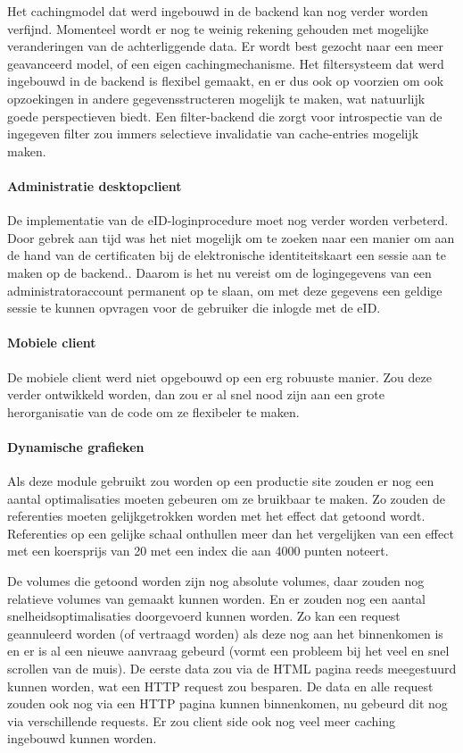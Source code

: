 Het cachingmodel dat werd ingebouwd in de backend kan nog verder worden verfijnd. Momenteel wordt er nog te weinig rekening gehouden met mogelijke veranderingen van de achterliggende data. Er wordt best gezocht naar een meer geavanceerd model, of een eigen cachingmechanisme. Het filtersysteem dat werd ingebouwd in de backend is flexibel gemaakt, en er dus ook op voorzien om ook opzoekingen in andere gegevensstructeren mogelijk te maken, wat natuurlijk goede perspectieven biedt. Een filter-backend die zorgt voor introspectie van de ingegeven filter zou immers selectieve invalidatie van cache-entries mogelijk maken.

\paragraph{Administratie desktopclient} De implementatie van de eID-loginprocedure moet nog verder worden verbeterd.  Door gebrek aan tijd was het niet mogelijk om te zoeken naar een manier om aan de hand van de certificaten bij de elektronische identiteitskaart een sessie aan te maken op de backend.. Daarom is het nu vereist om de logingegevens van een administratoraccount permanent op te slaan, om met deze gegevens een geldige sessie te kunnen opvragen voor de gebruiker die inlogde met de eID.

\paragraph{Mobiele client} De mobiele client werd niet opgebouwd op een erg robuuste manier. Zou deze verder ontwikkeld worden, dan zou er al snel nood zijn aan een grote herorganisatie van de code om ze flexibeler te maken.

\paragraph{Dynamische grafieken} Als deze module gebruikt zou worden op een productie site zouden er nog een aantal optimalisaties moeten gebeuren om ze bruikbaar te maken. Zo zouden de referenties moeten gelijkgetrokken worden met het effect dat getoond wordt. Referenties op een gelijke schaal onthullen meer dan het vergelijken van een effect met een koersprijs van 20 met een index die aan 4000 punten noteert.

De volumes die getoond worden zijn nog absolute volumes, daar zouden nog relatieve volumes van gemaakt kunnen worden. En er zouden nog een aantal snelheidsoptimalisaties doorgevoerd kunnen worden. Zo kan een request geannuleerd worden (of vertraagd worden) als deze nog aan het binnenkomen is en er is al een nieuwe aanvraag gebeurd (vormt een probleem bij het veel en snel scrollen van de muis). De eerste data zou via de HTML pagina reeds meegestuurd kunnen worden, wat een HTTP request zou besparen. De data en alle request zouden ook nog via een HTTP pagina kunnen binnenkomen, nu gebeurd dit nog via verschillende requests.
Er zou client side ook nog veel meer caching ingebouwd kunnen worden.


